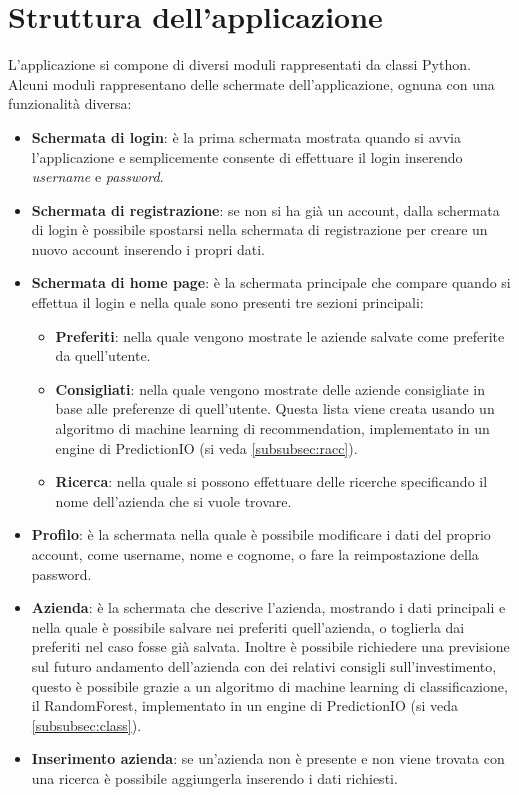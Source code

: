 \section{Struttura dell'applicazione}
L'applicazione si compone di diversi moduli rappresentati da classi Python. Alcuni moduli rappresentano delle schermate dell'applicazione, ognuna con una funzionalità diversa:
\begin{itemize}
\item \textbf{Schermata di login}: è la prima schermata mostrata quando si avvia l'applicazione e semplicemente consente di effettuare il login inserendo \textit{username} e \textit{password}.
\item \textbf{Schermata di registrazione}: se non si ha già un account, dalla schermata di login è possibile spostarsi nella schermata di registrazione per creare un nuovo account inserendo i propri dati.
\item \textbf{Schermata di home page}: è la schermata principale che compare quando si effettua il login e nella quale sono presenti tre sezioni principali:
\begin{itemize}
\item \textbf{Preferiti}: nella quale vengono mostrate le aziende salvate come preferite da quell'utente.
\item \textbf{Consigliati}: nella quale vengono mostrate delle aziende consigliate in base alle preferenze di quell'utente. Questa lista viene creata usando un algoritmo di machine learning di recommendation, implementato in un engine di PredictionIO (si veda  \ref{subsubsec:racc}).
\item \textbf{Ricerca}: nella quale si possono effettuare delle ricerche specificando il nome dell'azienda che si vuole trovare.
\end{itemize}
\item \textbf{Profilo}: è la schermata nella quale è possibile modificare i dati del proprio account, come username, nome e cognome, o fare la reimpostazione della password.
\item \textbf{Azienda}: è la schermata che descrive l'azienda, mostrando i dati principali e nella quale è possibile salvare nei preferiti quell'azienda, o toglierla dai preferiti nel caso fosse già salvata. Inoltre è possibile richiedere una previsione sul futuro andamento dell'azienda con dei relativi consigli sull'investimento, questo è possibile grazie a un algoritmo di machine learning di classificazione, il RandomForest, implementato in un engine di PredictionIO (si veda \ref{subsubsec:class}).
\item \textbf{Inserimento azienda}: se un'azienda non è presente e non viene trovata con una ricerca è possibile aggiungerla inserendo i dati richiesti.
\end{itemize}

